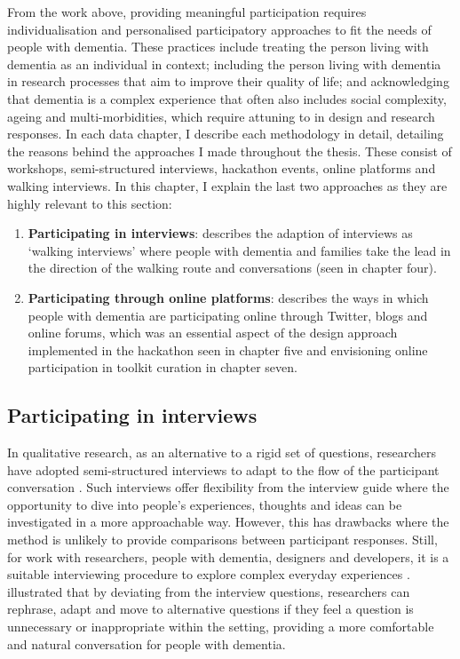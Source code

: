 From the work above, providing meaningful participation requires individualisation and personalised participatory approaches to fit the needs of people with dementia.  These practices include treating the person living with dementia as an individual in context; including the person living with dementia in research processes that aim to improve their quality of life; and acknowledging that dementia is a complex experience that often also includes social complexity, ageing and multi-morbidities, which require attuning to in design and research responses. In each data chapter, I describe each methodology in detail, detailing the reasons behind the approaches I made throughout the thesis. These consist of workshops, semi-structured interviews, hackathon events, online platforms and walking interviews. In this chapter, I explain the last two approaches as they are highly relevant to this section:
\begin{enumerate}

\item \textbf{Participating in interviews}: describes the adaption of interviews as `walking interviews' where people with dementia and families take the lead in the direction of the walking route and conversations (seen in chapter four).

\item \textbf{Participating through online platforms}: describes the ways in which people with dementia are participating online through Twitter, blogs and online forums, which was an essential aspect of the design approach implemented in the hackathon seen in chapter five and envisioning online participation in toolkit curation in chapter seven.
\end{enumerate}

\subsection{Participating in interviews}
\label{PD:Interviews}
In qualitative research, as an alternative to a rigid set of questions, researchers have adopted semi-structured interviews to adapt to the flow of the participant conversation \citep{cheston2000involving}. Such interviews offer flexibility from the interview guide where the opportunity to dive into people’s experiences, thoughts and ideas can be investigated in a more approachable way. However, this has drawbacks where the method is unlikely to provide comparisons between participant responses. Still, for work with researchers, people with dementia, designers and developers, it is a suitable interviewing procedure to explore complex everyday experiences  \citep{horton2004qualitative}. \cite{samsi2020interviewing} illustrated that by deviating from the interview questions, researchers can rephrase, adapt and move to alternative questions if they feel a question is unnecessary or inappropriate within the setting, providing a more comfortable and natural conversation for people with dementia.

